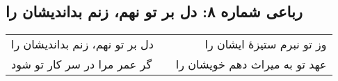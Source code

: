 \begin{center}
\section*{رباعی شماره ۸: دل بر تو نهم، زنم بداندیشان را}
\label{sec:008}
\begin{longtable}{l p{0.5cm} r}
دل بر تو نهم، زنم بداندیشان را
&&
وز تو نبرم ستیزهٔ ایشان را
\\
گر عمر مرا در سر کار تو شود
&&
عهد تو به میراث دهم خویشان را
\\
\end{longtable}
\end{center}
